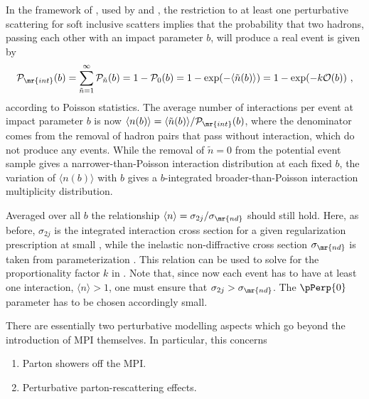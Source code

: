 In the framework of \cite{Sjostrand:1987su}, used by \pythia and
\Sherpa, the restriction to at least one perturbative scattering for soft
inclusive scatters implies that
the probability that two hadrons, passing each other
with an impact parameter $b$, will produce a real event is given by
\begin{equation}
\mathcal{P}_{\mr{int}}(b) =
\sum_{\tilde{n} = 1}^{\infty} \mathcal{P}_{\tilde{n}}(b) =
1 - \mathcal{P}_0(b) =
1 - \exp ( - \langle \tilde{n}(b) \rangle )
= 1 - \exp (- k \mathcal{O}(b) ) ~,
\end{equation}
according to Poisson statistics. The average number of
interactions per event at impact parameter $b$ is now
$\langle n(b) \rangle = \langle \tilde{n}(b) \rangle /
\mathcal{P}_{\mr{int}}(b)$, where the denominator comes from the
removal of hadron pairs that pass without interaction, \ie which do
not produce any events. While the removal of $\tilde{n}=0$ from the potential
event sample gives a narrower-than-Poisson interaction distribution
at each fixed $b$, the variation of $\langle n(b) \rangle$ with $b$
gives a $b$-integrated broader-than-Poisson interaction multiplicity
distribution.

Averaged over all $b$ the relationship $\langle n \rangle =
\sigma_{2j}/\sigma_{\mr{nd}}$ should still hold. Here, as before,
$\sigma_{2j}$ is the integrated interaction cross section for a given
regularization prescription at small \pt, while the inelastic
non-diffractive cross section $\sigma_{\mr{nd}}$ is taken from
parameterization \cite{Donnachie:1992ny,Donnachie:2004pi,Schuler:1993wr}.
This relation can be used to solve for the
proportionality factor $k$ in . Note that, since
now each event has to have at least one interaction, $\langle n
\rangle > 1$, one must ensure that $\sigma_{2j} >
\sigma_{\mr{nd}}$. The $\pPerp{0}$ parameter has to be chosen
accordingly small.

There are essentially two perturbative modelling aspects which go
beyond the introduction of MPI themselves. In particular, this concerns
\begin{enumerate}
\item Parton showers off the MPI.
\item Perturbative parton-rescattering effects.
\end{enumerate}

